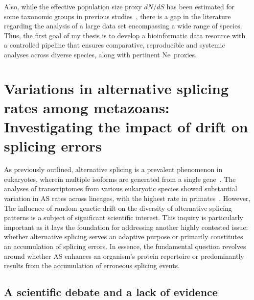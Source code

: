 Also, while the effective population size proxy $dN/dS$ has been estimated for some taxonomic groups in previous studies~\citep{romiguier_fast_2012, figuet_life_2016, lefebure_less_2017, bolivar_gc-biased_2019}, there is a gap in the literature regarding the analysis of a large data set encompassing a wide range of species. Thus, the first goal of my thesis is to develop a bioinformatic data resource with a controlled pipeline that ensures comparative, reproducible and systemic analyses across diverse species, along with pertinent \acrshort{Ne}~proxies.


\section{Variations in alternative splicing rates among metazoans: Investigating the impact of drift on splicing errors}

As previously outlined, alternative splicing is a prevalent phenomenon in eukaryotes, wherein multiple isoforms are generated from a single gene~\citep{chen_correcting_2014}. 
The analyses of transcriptomes from various eukaryotic species showed substantial variation in AS rates across lineages, with the highest rate in primates~\citep{barbosa-morais_evolutionary_2012,chen_correcting_2014, mazin_alternative_2021}. However, The influence of random genetic drift on the diversity of alternative splicing patterns is a subject of significant scientific interest. This inquiry is particularly important as it lays the foundation for addressing another highly contested issue: whether alternative splicing serves an adaptive purpose or primarily constitutes an accumulation of splicing errors. In essence, the fundamental question revolves around whether AS enhances an organism's protein repertoire or predominantly results from the accumulation of erroneous splicing events.


\subsection{A scientific debate and a lack of evidence}

